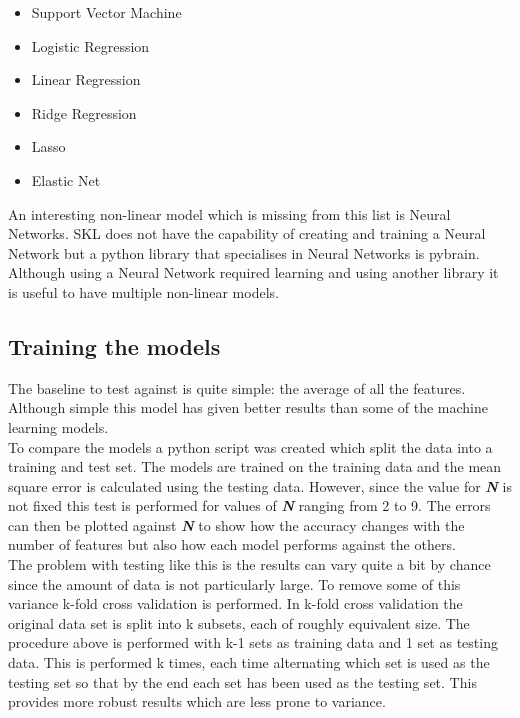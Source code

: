 \begin{itemize}
\item Support Vector Machine
\item Logistic Regression
\item Linear Regression
\item Ridge Regression
\item Lasso
\item Elastic Net
\end{itemize}
An interesting non-linear model which is missing from this list is Neural Networks. SKL does not have the capability of creating and training a Neural Network but a python library that specialises in Neural Networks is pybrain. Although using a Neural Network required learning and using another library it is useful to have multiple non-linear models.


\subsection{Training the models}
The baseline to test against is quite simple: the average of all the features. Although simple this model has given better results than some of the machine learning models.
\\
To compare the models a python script was created which split the data into a training and test set. The models are trained on the training data and the mean square error is calculated using the testing data. However, since the value for \textit{\textbf{N}} is not fixed this test is performed for values of \textit{\textbf{N}} ranging from 2 to 9. The errors can then be plotted against \textit{\textbf{N}} to show how the accuracy changes with the number of features but also how each model performs against the others.
\\
The problem with testing like this is the results can vary quite a bit by chance since the amount of data is not particularly large. To remove some of this variance k-fold cross validation is performed. In k-fold cross validation the original data set is split into k subsets, each of roughly equivalent size. The procedure above is performed with k-1 sets as training data and 1 set as testing data. This is performed k times, each time alternating which set is used as the testing set so that by the end each set has been used as the testing set. This provides more robust results which are less prone to variance.

